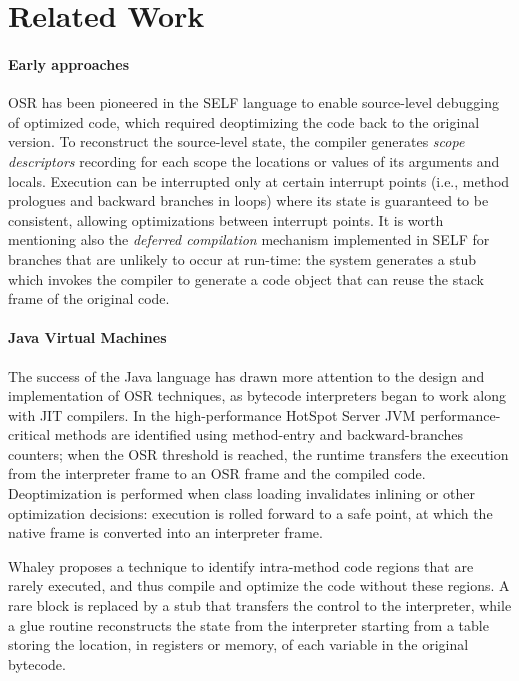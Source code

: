 \section{Related Work}
\label{se:related}

\paragraph{Early approaches}
OSR has been pioneered in the SELF language\cite{holzle1992self} to enable source-level debugging of optimized code, which required deoptimizing the code back to the original version. To reconstruct the source-level state, the compiler generates {\em scope descriptors} recording for each scope the locations or values of its arguments and locals. Execution can be interrupted only at certain interrupt points (i.e., method prologues and backward branches in loops) where its state is guaranteed to be consistent, allowing optimizations between interrupt points. It is worth mentioning also the {\em deferred compilation} mechanism\cite{chambers1991self} implemented in SELF for branches that are unlikely to occur at run-time: the system generates a stub which invokes the compiler to generate a code object that can reuse the stack frame of the original code.

\paragraph{Java Virtual Machines}
The success of the Java language has drawn more attention to the design and implementation of OSR techniques, as bytecode interpreters began to work along with JIT compilers. In the high-performance HotSpot Server JVM\cite{paleczny2001hotspot} performance-critical methods are identified using method-entry and backward-branches counters; when the OSR threshold is reached, the runtime transfers the execution from the interpreter frame to an OSR frame and the compiled code. Deoptimization is performed when class loading invalidates inlining or other optimization decisions: execution is rolled forward to a safe point, at which the native frame is converted into an interpreter frame.

Whaley\cite{whaley2001osr} proposes a technique to identify intra-method code regions that are rarely executed, and thus compile and optimize the code without these regions. A rare block is replaced by a stub that transfers the control to the interpreter, while a glue routine reconstructs the state from the interpreter starting from a table storing the location, in registers or memory, of each variable in the original bytecode.

